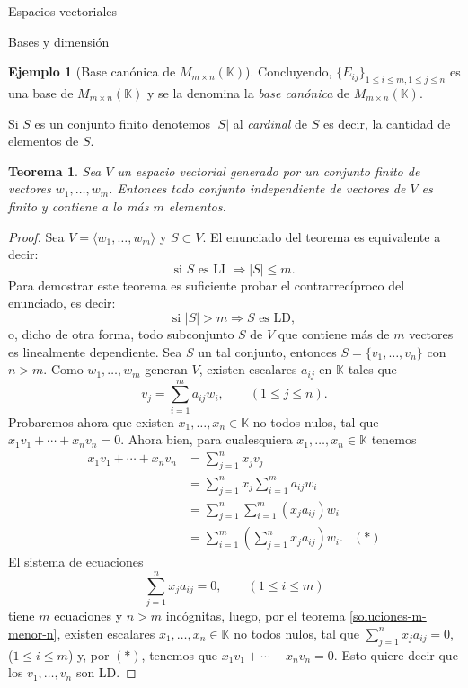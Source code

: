 \documentclass[a4paper,12pt,twoside,spanish]{amsbook}
\newtheorem{teorema}{Teorema}[section]
\theoremstyle{definition}
\newtheorem{ejemplo}{Ejemplo}[section]
\theoremstyle{remark}
\newcommand{\la}{\langle}
\newcommand{\ra}{\rangle}
\newcommand{\K}{\mathbb K}
\begin{document}
\begin{chapter}{Espacios vectoriales}
\begin{section}{Bases y dimensión}
\begin{ejemplo}[{\sc Base canónica de $M_{m \times n}(\K)$}]
	Concluyendo,  $\{E_{ij} \}_{1 \le i \le m, 1\le j \le n}$ es una base de  $M_{m \times n}(\K)$ y se la denomina la \textit{base canónica} de  $M_{m \times n}(\K)$.
\end{ejemplo}



Si $S$ es un conjunto finito denotemos $|S|$  al \textit{cardinal} de  $S$ es decir, la cantidad de elementos de $S$. 

\begin{teorema}\label{indep-menorigual-gen}
	Sea $V$ un espacio vectorial generado por un conjunto finito de vectores $w_1,\ldots,w_m$. Entonces todo conjunto independiente de vectores de $V$ es finito y  contiene a lo más $m$ elementos. 
\end{teorema}
\begin{proof} Sea $V = \la w_1,\ldots,w_m\ra$ y  $S \subset V$.   El  enunciado del teorema es equivalente a decir:
	$$
	\text{si }S \text{ es LI } \Rightarrow |S| \le m.
	$$
	Para demostrar este teorema es suficiente probar el contrarrecíproco del enunciado, es decir:
	$$
	\text{si }|S| > m \Rightarrow S \text{ es LD},
	$$
	o, dicho  de otra forma, todo subconjunto $S$ de $V$ que contiene más de $m$ vectores es linealmente dependiente. Sea $S$ un tal conjunto,  entonces $S = \{v_1,\ldots,v_n\}$ con $n >m$.  Como  $w_1,\ldots,w_m$ generan $V$, existen escalares $a_{ij}$ en $\K$ tales que
	\begin{equation*}
		v_j = \sum_{i=1}^{m}a_{ij}w_i, \qquad (1 \le j \le n).
	\end{equation*}
	Probaremos ahora que existen $x_1,\ldots,x_n \in \K$ no todos nulos, tal que $x_1v_1 + \cdots+x_nv_n =0$. Ahora bien, para cualesquiera $x_1,\ldots,x_n \in \K$ tenemos
	\begin{align*}
		x_1v_1 + \cdots+x_nv_n &= \sum_{j=1}^{n} x_jv_j& \\
		& = \sum_{j=1}^{n}x_j \sum_{i=1}^{m}a_{ij}w_i& \\
		& = \sum_{j=1}^{n} \sum_{i=1}^{m}(x_ja_{ij})w_i& \\ 
		& = \sum_{i=1}^{m}(\sum_{j=1}^{n} x_ja_{ij})w_i.&  (*)
	\end{align*}
	El sistema de ecuaciones
	\begin{equation*}
		\sum_{j=1}^{n} x_ja_{ij} = 0, \qquad (1 \le i \le m) 
	\end{equation*}
	tiene $m$ ecuaciones  y $n > m$ incógnitas, luego, por el teorema \ref{soluciones-m-menor-n}, existen escalares $x_1,\ldots,x_n \in \K$ no todos nulos, tal que $\sum_{j=1}^{n} x_ja_{ij} = 0$, ($1 \le i \le m$) y, por $(*)$, tenemos que  $x_1v_1 + \cdots+x_nv_n =0$. Esto quiere decir que los $v_1,\ldots,v_n$ son LD.
\end{proof}



\end{section}
\end{chapter}
\end{document}
